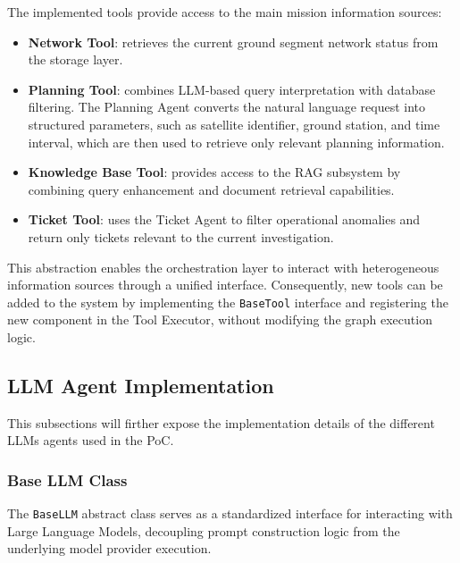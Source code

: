 The implemented tools provide access to the main mission information sources:

\begin{itemize}
    \item \textbf{Network Tool}: retrieves the current ground segment network status from the storage layer.
    
    \item \textbf{Planning Tool}: combines LLM-based query interpretation with database filtering. The Planning Agent converts the natural language request into structured parameters, such as satellite identifier, ground station, and time interval, which are then used to retrieve only relevant planning information.
    
    \item \textbf{Knowledge Base Tool}: provides access to the RAG subsystem by combining query enhancement and document retrieval capabilities.
    
    \item \textbf{Ticket Tool}: uses the Ticket Agent to filter operational anomalies and return only tickets relevant to the current investigation.
\end{itemize}

This abstraction enables the orchestration layer to interact with heterogeneous information sources through a unified interface. Consequently, new tools can be added to the system by implementing the \texttt{BaseTool} interface and registering the new component in the Tool Executor, without modifying the graph execution logic.

\subsection{LLM Agent Implementation}
This subsections will firther expose the implementation details of the different LLMs agents used in the PoC.

\subsubsection{Base LLM Class}
The \texttt{BaseLLM} abstract class serves as a standardized interface for interacting with Large Language Models, decoupling prompt construction logic from the underlying model provider execution.

